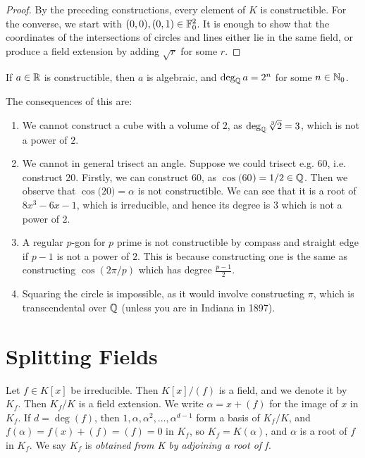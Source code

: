 \documentclass[a4paper, 10pt, twocolumn]{amsart}
\begin{document}
\begin{proof}
By the preceding constructions, every element of $K$ is constructible. For the converse, we start with $(0,0), (0,1) \in \mathbb{F}_0^2$. It is enough to show that the coordinates of the intersections of circles and lines either lie in the same field, or produce a field extension by adding $\sqrt{r}$ for some $r$.
\end{proof}

\begin{corollary}
If $a \in \mathbb{R}$ is constructible, then $a$ is algebraic, and $\deg_{\mathbb{Q}} a = 2^n$ for some $n\in \mathbb{N}_{0}$.
\end{corollary}

The consequences of this are:
\begin{enumerate}
\item We cannot construct a cube with a volume of $2$, as $\deg_{\mathbb{Q}} \sqrt[3]{2} = 3$, which is not a power of $2$.
\item We cannot in general trisect an angle. Suppose we could trisect e.g. 60\textdegree, i.e. construct 20\textdegree. Firstly, we can construct 60\textdegree, as $\cos(60$\textdegree$) = 1/2 \in \mathbb{Q}$. Then we observe that $\cos(20$\textdegree$) = \alpha$ is not constructible. We can see that it is a root of $8x^3 - 6x - 1$, which is irreducible, and hence its degree is $3$ which is not a power of $2$.
\item A regular $p$-gon for $p$ prime is not constructible by compass and straight edge if $p-1$ is not a power of $2$. This is because constructing one is the same as constructing $\cos(2\pi/p)$ which has degree $\frac{p-1}{2}$.
\item Squaring the circle is impossible, as it would involve constructing $\pi$, which is transcendental over $\mathbb{Q}$ (unless you are in Indiana in 1897).
\end{enumerate}
\section{Splitting Fields}
Let $f\in K[x]$ be irreducible. Then $K[x]/(f)$ is a field, and we denote it by $K_f$. Then $K_f/K$ is a field extension. We write $\alpha = x+(f)$ for the image of $x$ in $K_f$. If $d = \deg(f)$, then $1, \alpha, \alpha^2, \ldots, \alpha^{d-1}$ form a basis of $K_f/K$, and $f(\alpha) = f(x) + (f) = (f) = 0$ in $K_f$, so $K_f = K(\alpha)$, and $\alpha$ is a root of $f$ in $K_f$. We say $K_f$ is \emph{obtained from K by adjoining a root of f.}
\end{document}
